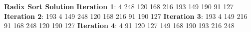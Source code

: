 \documentclass{article}
\begin{document}
\textbf{Radix Sort Solution}
\textbf{Iteration 1}: 4 248 120 168 216 193 149 190 91 127 \newline
\textbf{Iteration 2}: 193 4 149 248 120 168 216 91 190 127 \newline
\textbf{Iteration 3}: 193 4 149 216 91 168 248 120 190 127 \newline
\textbf{Iteration 4}: 4 91 120 127 149 168 190 193 216 248 \newline
\end{document}
